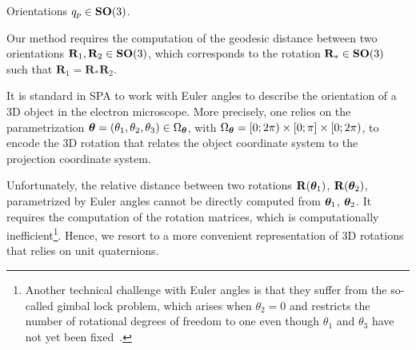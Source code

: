 
Orientations $q_p \in \mathrm{\mathbf{SO}}(3)$.
 

Our method requires the computation of the geodesic distance between two orientations $\mathbf{R}_1, \mathbf{R}_2 \in \mathrm{\mathbf{SO}}(3)$, which corresponds to the rotation $\mathbf{R}_* \in \mathrm{\mathbf{SO}}(3)$ such that $\mathbf{R}_1 = \mathbf{R}_* \mathbf{R}_2$.

It is standard in SPA to work with Euler angles to describe the orientation of a 3D object in the electron microscope.
More precisely, one relies on the parametrization ${\boldsymbol{\theta}}=(\theta_1,\theta_2,\theta_3)\in\Omega_{\boldsymbol{\theta}}$, with $\Omega_{\boldsymbol{\theta}}=[0;2\pi)\times [0;\pi] \times [0;2\pi)$, to encode the 3D rotation that relates the object coordinate system to the projection coordinate system.

Unfortunately, the relative distance between two rotations $\mathbf{R}({\boldsymbol{\theta}}_1)$, $\mathbf{R}({\boldsymbol{\theta}}_2)$, parametrized by Euler angles cannot be directly computed from ${\boldsymbol{\theta}}_1$, ${\boldsymbol{\theta}}_2$.
It requires the computation of the rotation matrices, which is computationally inefficient\footnote{Another technical challenge with Euler angles is that they suffer from the so-called gimbal lock problem, which arises when $\theta_2=0$ and restricts the number of rotational degrees of freedom to one even though $\theta_1$ and $\theta_3$ have not yet been fixed~\cite{koks2006explorations}.}.
Hence, we resort to a more convenient representation of 3D rotations that relies on unit quaternions.

